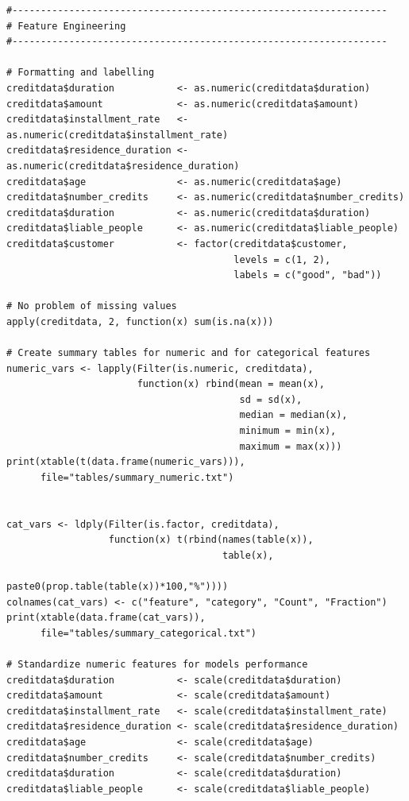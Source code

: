 \documentclass[12pt]{article}
\begin{document}
\begin{lstlisting}
#------------------------------------------------------------------
# Feature Engineering
#------------------------------------------------------------------

# Formatting and labelling
creditdata$duration           <- as.numeric(creditdata$duration)
creditdata$amount             <- as.numeric(creditdata$amount)
creditdata$installment_rate   <- as.numeric(creditdata$installment_rate)
creditdata$residence_duration <- as.numeric(creditdata$residence_duration)
creditdata$age                <- as.numeric(creditdata$age)
creditdata$number_credits     <- as.numeric(creditdata$number_credits)
creditdata$duration           <- as.numeric(creditdata$duration)
creditdata$liable_people      <- as.numeric(creditdata$liable_people)
creditdata$customer           <- factor(creditdata$customer, 
                                        levels = c(1, 2), 
                                        labels = c("good", "bad"))

# No problem of missing values
apply(creditdata, 2, function(x) sum(is.na(x)))

# Create summary tables for numeric and for categorical features
numeric_vars <- lapply(Filter(is.numeric, creditdata), 
                       function(x) rbind(mean = mean(x),
                                         sd = sd(x),
                                         median = median(x),
                                         minimum = min(x),
                                         maximum = max(x)))
print(xtable(t(data.frame(numeric_vars))), 
      file="tables/summary_numeric.txt")


cat_vars <- ldply(Filter(is.factor, creditdata), 
                  function(x) t(rbind(names(table(x)),
                                      table(x),
                                      paste0(prop.table(table(x))*100,"%"))))
colnames(cat_vars) <- c("feature", "category", "Count", "Fraction")
print(xtable(data.frame(cat_vars)), 
      file="tables/summary_categorical.txt")

# Standardize numeric features for models performance
creditdata$duration           <- scale(creditdata$duration)
creditdata$amount             <- scale(creditdata$amount)
creditdata$installment_rate   <- scale(creditdata$installment_rate)
creditdata$residence_duration <- scale(creditdata$residence_duration)
creditdata$age                <- scale(creditdata$age)
creditdata$number_credits     <- scale(creditdata$number_credits)
creditdata$duration           <- scale(creditdata$duration)
creditdata$liable_people      <- scale(creditdata$liable_people)



\end{lstlisting}
\end{document}
